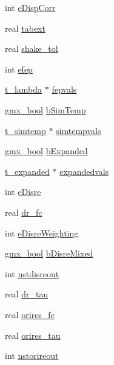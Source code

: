 \begin{DoxyCompactItemize}
int \hyperlink{structt__inputrec_a3cc32a63c95dd7bead9442d3e47e885b}{e\-Disp\-Corr}
\item 
real \hyperlink{structt__inputrec_a52b83013eb7153e4a0dbe8e8fd46e785}{tabext}
\item 
real \hyperlink{structt__inputrec_a1a4565dccb4b50b88305afa74fc0368e}{shake\-\_\-tol}
\item 
int \hyperlink{structt__inputrec_a6d8e9cf8f43c4bffb2f41b844c18c691}{efep}
\item 
\hyperlink{structt__lambda}{t\-\_\-lambda} $\ast$ \hyperlink{structt__inputrec_af391f9c295d170bdccf0c8af559a4945}{fepvals}
\item 
\hyperlink{include_2types_2simple_8h_a8fddad319f226e856400d190198d5151}{gmx\-\_\-bool} \hyperlink{structt__inputrec_a2b7bef5f31b112a8f366cbf3bd7cab30}{b\-Sim\-Temp}
\item 
\hyperlink{structt__simtemp}{t\-\_\-simtemp} $\ast$ \hyperlink{structt__inputrec_a5e1e0b9d8cb1bbf9d2ef0fc21b40e073}{simtempvals}
\item 
\hyperlink{include_2types_2simple_8h_a8fddad319f226e856400d190198d5151}{gmx\-\_\-bool} \hyperlink{structt__inputrec_a06070797c200d51efaef9578e0a2fabe}{b\-Expanded}
\item 
\hyperlink{structt__expanded}{t\-\_\-expanded} $\ast$ \hyperlink{structt__inputrec_a9a757557dd75ece12b7650508fd1e2d8}{expandedvals}
\item 
int \hyperlink{structt__inputrec_aa00f3106406cd75e93c4037820bdc0b9}{e\-Disre}
\item 
real \hyperlink{structt__inputrec_a8d9ea742f99a280ba9362dbe2cffb463}{dr\-\_\-fc}
\item 
int \hyperlink{structt__inputrec_ad220cbf3a3866dd97a267619c7b14726}{e\-Disre\-Weighting}
\item 
\hyperlink{include_2types_2simple_8h_a8fddad319f226e856400d190198d5151}{gmx\-\_\-bool} \hyperlink{structt__inputrec_ace5e86f74ee4cf7ffe3d2f6bf434a9ea}{b\-Disre\-Mixed}
\item 
int \hyperlink{structt__inputrec_a20025fe1bbbac31b61dac7e99fec808c}{nstdisreout}
\item 
real \hyperlink{structt__inputrec_a8a5373792dd65b6ee21934bc1f81bdaa}{dr\-\_\-tau}
\item 
real \hyperlink{structt__inputrec_a9bc4d01ffedfd86b391d7940da882df4}{orires\-\_\-fc}
\item 
real \hyperlink{structt__inputrec_a755e4a22251fc081c3aa2098c119e1f8}{orires\-\_\-tau}
\item 
int \hyperlink{structt__inputrec_aefee7b269ada1efe3c192d572f610fb9}{nstorireout}

\end{DoxyCompactItemize}
